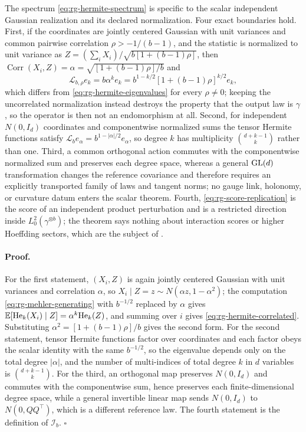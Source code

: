 The spectrum \eqref{eq:rg-hermite-spectrum} is specific to the scalar
independent Gaussian realization and its declared normalization.  Four exact
boundaries hold.  First, if the coordinates are jointly centered Gaussian with
unit variances and common pairwise correlation \(\rho>-1/(b-1)\), and the
statistic is normalized to unit variance as
\(Z=(\sum_iX_i)/\sqrt{b[1+(b-1)\rho]}\), then
\(\operatorname{Corr}(X_i,Z)=\alpha=\sqrt{[1+(b-1)\rho]/b}\) and
\begin{equation}
 \mathscr L_{b,\rho}e_k=b\alpha^ke_k
 =b^{1-k/2}\left[1+(b-1)\rho\right]^{k/2}e_k,
 \label{eq:rg-hermite-correlated}
\end{equation}
which differs from \eqref{eq:rg-hermite-eigenvalues} for every \(\rho\neq0\);
keeping the uncorrelated normalization instead destroys the property that the
output law is \(\gamma\), so the operator is then not an endomorphism at all.
Second, for independent \(N(0,I_d)\) coordinates and componentwise normalized
sums the tensor Hermite functions satisfy
\(\mathscr L_be_\alpha=b^{1-\lvert\alpha\rvert/2}e_\alpha\), so degree \(k\) has
multiplicity \(\binom{d+k-1}{k}\) rather than one.  Third, a common orthogonal
action commutes with the componentwise normalized sum and preserves each degree
space, whereas a general \(\mathrm{GL}(d)\) transformation changes the reference
covariance and therefore requires an explicitly transported family of laws and
tangent norms; no gauge link, holonomy, or curvature datum enters the scalar
theorem.  Fourth, \eqref{eq:rg-score-replication} is the score of an independent
product perturbation and is a restricted direction inside
\(L^2_0(\gamma^{\otimes b})\); the theorem says nothing about interaction scores
or higher Hoeffding sectors, which are the subject of
. 

\paragraph{Proof.}
For the first statement, \((X_i,Z)\) is again jointly centered Gaussian with
unit variances and correlation \(\alpha\), so
\(X_i\mid Z=z\sim N(\alpha z,1-\alpha^2)\); the computation
\eqref{eq:rg-mehler-generating} with \(b^{-1/2}\) replaced by \(\alpha\) gives
\(\mathbb E[\mathrm{He}_k(X_i)\mid Z]=\alpha^k\mathrm{He}_k(Z)\), and summing over
\(i\) gives \eqref{eq:rg-hermite-correlated}.  Substituting
\(\alpha^2=[1+(b-1)\rho]/b\) gives the second form.  For the second statement,
tensor Hermite functions factor over coordinates and each factor obeys the
scalar identity with the same \(b^{-1/2}\), so the eigenvalue depends only on
the total degree \(\lvert\alpha\rvert\), and the number of multi-indices of
total degree \(k\) in \(d\) variables is \(\binom{d+k-1}{k}\).  For the third,
an orthogonal map preserves \(N(0,I_d)\) and commutes with the componentwise
sum, hence preserves each finite-dimensional degree space, while a general
invertible linear map sends \(N(0,I_d)\) to \(N(0,QQ^\top)\), which is a
different reference law.  The fourth statement is the definition of
\(\mathscr I_b\). \(\square\)


